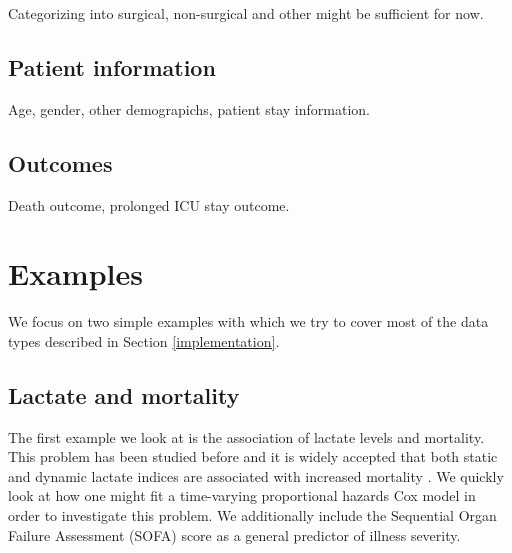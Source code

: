 \documentclass[
]{jss}
\begin{document}
Categorizing into surgical, non-surgical and other might be sufficient
for now.

\hypertarget{patient-information}{%
\subsection{Patient information}\label{patient-information}}

Age, gender, other demograpichs, patient stay information.

\hypertarget{outcomes}{%
\subsection{Outcomes}\label{outcomes}}

Death outcome, prolonged ICU stay outcome.

\hypertarget{examples}{%
\section{Examples}\label{examples}}

We focus on two simple examples with which we try to cover most of the
data types described in Section \ref{implementation}.

\hypertarget{lactate-and-mortality}{%
\subsection{Lactate and mortality}\label{lactate-and-mortality}}

The first example we look at is the association of lactate levels and
mortality. This problem has been studied before and it is widely
accepted that both static and dynamic lactate indices are associated
with increased mortality
\citep{haas2016severe, nichol2011dynamic, van2013cumulative}. We quickly
look at how one might fit a time-varying proportional hazards Cox model
\citep{therneau2015package} in order to investigate this problem. We
additionally include the Sequential Organ Failure Assessment (SOFA)
score \citep{vincent1996sofa} as a general predictor of illness
severity.
\end{document}
